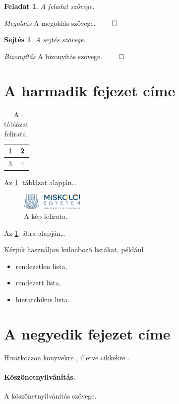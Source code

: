 \documentclass[a4paper,12pt]{article}
\newtheorem{exercise}[theorem]{Feladat}%
\newtheorem{conjecture}[theorem]{Sejtés}%
\renewenvironment{proof}[1][]{\noindent\textit{Bizonyítás} }{$\qed$}
\newenvironment{solution}[1][]{\noindent\textit{Megoldás} }{$\qed$}
\begin{document}
\begin{exercise}
A feladat szövege. 
\end{exercise}

\begin{solution}
A megoldás szövege. 
\end{solution}

\begin{conjecture}
A sejtés szövege. 
\end{conjecture}

\begin{proof}
A bizonyítás szövege. 
\end{proof}

\section{A harmadik fejezet címe}

\begin{table}[!ht] %
  \centering
  \caption{A táblázat felirata.}\label{table:Key3}
  \medskip
  \begin{tabular}{|c|c|}
    \hline
    1 & 2 \\
    \hline
    3 & 4 \\
    \hline
  \end{tabular}
\end{table}

Az \ref{table:Key3}. táblázat alapján\dots

\begin{figure}[!ht] %
  \centering
  \includegraphics[width=3cm]{ME_Logo.png}
  \caption{A kép felirata.}\label{figure:Key4}
\end{figure}

Az \ref{figure:Key4}. ábra alapján\dots

Kérjük használjon különböző listákat, például
\begin{itemize}
\item rendezetlen lista,
\item rendezett lista,
\item hierarchikus lista.
\end{itemize}

\section{A negyedik fejezet címe}%

Hivatkozzon könyvekre \cite{erdos2013}, illetve cikkekre \cite{aczel1983}.

\paragraph{Köszönetnyilvánítás.} A köszönetnyilvánítás szövege.



\end{document}

